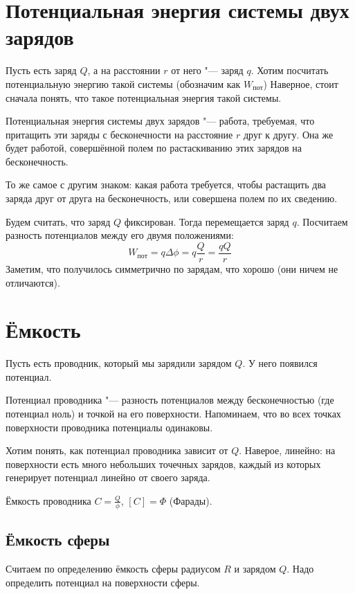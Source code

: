 \section{Потенциальная энергия системы двух зарядов}
  Пусть есть заряд $Q$, а на расстоянии $r$ от него "--- заряд $q$.
  Хотим посчитать потенциальную энергию такой системы (обозначим как $W_{пот}$)
  Наверное, стоит сначала понять, что такое потенциальная энергия такой системы.
  \begin{Def}
    Потенциальная энергия системы двух зарядов "--- работа, требуемая, что притащить
    эти заряды с бесконечности на расстояние $r$ друг к другу.
    Она же будет работой, совершённой полем по растаскиванию этих зарядов на бесконечность.
  \end{Def}
  \begin{Rem}
    То же самое с другим знаком: какая работа требуется, чтобы растащить два заряда друг от друга на бесконечность, или совершена полем по их сведению.
  \end{Rem}
  Будем считать, что заряд $Q$ фиксирован.
  Тогда перемещается заряд $q$.
  Посчитаем разность потенциалов между его двумя положениями:
  \[W_{пот} = q \Delta \phi = q \frac{Q} r = \frac{qQ}{r}\]
  Заметим, что получилось симметрично по зарядам, что хорошо (они ничем не отличаются).

\section{Ёмкость}
  Пусть есть проводник, который мы зарядили зарядом $Q$.
  У него появился потенциал.
  \begin{Def}
    Потенциал проводника "--- разность потенциалов между бесконечностью (где потенциал ноль) и точкой на его поверхности.
    Напоминаем, что во всех точках поверхности проводника потенциалы одинаковы.
  \end{Def}
  Хотим понять, как потенциал проводника зависит от $Q$.
  Наверое, линейно: на поверхности есть много небольших точечных зарядов, каждый из которых генерирует потенциал линейно от своего заряда.
  \begin{Def}
    Ёмкость проводника $C=\frac{Q}{\phi}$, $[C]=\Phi$ (Фарады).
  \end{Def}

  \subsection{Ёмкость сферы}
    Считаем по определению ёмкость сферы радиусом $R$ и зарядом $Q$.
    Надо определить потенциал на поверхности сферы.
